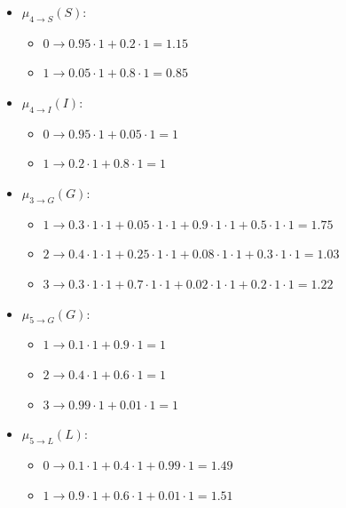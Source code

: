 \begin{example}
\begin{itemize}
\begin{itemize}
            \end{itemize}
        \item $\mu_{4 \rightarrow S}(S)$: 
            \begin{itemize}
                \item $0 \rightarrow 0.95 \cdot 1 + 0.2 \cdot 1 = 1.15$
                \item $1 \rightarrow 0.05 \cdot 1 + 0.8 \cdot 1 = 0.85$
            \end{itemize}
        \item $\mu_{4 \rightarrow I}(I)$:
            \begin{itemize}
                \item $0 \rightarrow 0.95 \cdot 1 + 0.05 \cdot 1 =1$
                \item $1 \rightarrow 0.2 \cdot 1 + 0.8 \cdot 1 =1$
            \end{itemize}
        \item $\mu_{3 \rightarrow G}(G)$:
            \begin{itemize}
                \item $1 \rightarrow 0.3 \cdot 1 \cdot 1 + 0.05 \cdot 1 \cdot 1 + 0.9 \cdot 1 \cdot 1 + 0.5 \cdot 1 \cdot 1 = 1.75$
                \item $2 \rightarrow 0.4 \cdot 1 \cdot 1 + 0.25 \cdot 1 \cdot 1 + 0.08 \cdot 1 \cdot 1 + 0.3 \cdot 1 \cdot 1 = 1.03$
                \item $3 \rightarrow 0.3 \cdot 1 \cdot 1 + 0.7 \cdot 1 \cdot 1 + 0.02 \cdot 1 \cdot 1 + 0.2 \cdot 1 \cdot 1 = 1.22$
            \end{itemize}
        \item $\mu_{5 \rightarrow G}(G)$:
            \begin{itemize}
                \item $1 \rightarrow 0.1 \cdot 1 + 0.9 \cdot 1 = 1$
                \item $2 \rightarrow 0.4 \cdot 1 + 0.6 \cdot 1  = 1$
                \item $3 \rightarrow 0.99 \cdot 1 + 0.01 \cdot 1  = 1$
            \end{itemize}
        \item $\mu_{5 \rightarrow L}(L)$:
            \begin{itemize}
                \item $0 \rightarrow 0.1 \cdot 1 + 0.4 \cdot 1 + 0.99 \cdot 1 = 1.49$
                \item $1 \rightarrow 0.9 \cdot 1 + 0.6 \cdot 1 + 0.01 \cdot 1 = 1.51$

\end{itemize}
\end{itemize}
\end{example}
